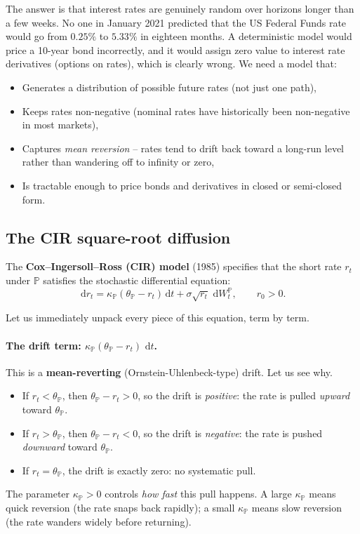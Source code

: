 \documentclass[11pt]{article}
\newcommand{\PP}{\mathbb{P}}
\newcommand{\dd}{\,\mathrm{d}}
\begin{document}
The answer is that interest rates are genuinely random over horizons longer
than a few weeks.  No one in January 2021 predicted that the US Federal
Funds rate would go from $0.25\%$ to $5.33\%$ in eighteen months.  A
deterministic model would price a 10-year bond incorrectly, and it would
assign zero value to interest rate derivatives (options on rates), which is
clearly wrong.  We need a model that:
\begin{itemize}
  \item Generates a distribution of possible future rates (not just one path),
  \item Keeps rates non-negative (nominal rates have historically been
  non-negative in most markets),
  \item Captures \emph{mean reversion} -- rates tend to drift back toward a
  long-run level rather than wandering off to infinity or zero,
  \item Is tractable enough to price bonds and derivatives in closed or
  semi-closed form.
\end{itemize}

\subsection{The CIR square-root diffusion}

The \textbf{Cox--Ingersoll--Ross (CIR) model} (1985) specifies that the
short rate $r_t$ under $\PP$ satisfies the stochastic differential equation:
\[
\dd r_t = \kappa_\PP\!\left(\theta_\PP - r_t\right)\dd t
+ \sigma\sqrt{r_t}\,\dd W_t^\PP, \qquad r_0 > 0.
\]

Let us immediately unpack every piece of this equation, term by term.

\paragraph{The drift term: $\kappa_\PP(\theta_\PP - r_t)\,\dd t$.}
This is a \textbf{mean-reverting} (Ornstein-Uhlenbeck-type) drift.  Let us
see why.
\begin{itemize}
  \item If $r_t < \theta_\PP$, then $\theta_\PP - r_t > 0$, so the drift is
  \emph{positive}: the rate is pulled \emph{upward} toward $\theta_\PP$.
  \item If $r_t > \theta_\PP$, then $\theta_\PP - r_t < 0$, so the drift is
  \emph{negative}: the rate is pushed \emph{downward} toward $\theta_\PP$.
  \item If $r_t = \theta_\PP$, the drift is exactly zero: no systematic pull.
\end{itemize}
The parameter $\kappa_\PP > 0$ controls \emph{how fast} this pull happens.
A large $\kappa_\PP$ means quick reversion (the rate snaps back rapidly); a
small $\kappa_\PP$ means slow reversion (the rate wanders widely before
returning).
\end{document}
